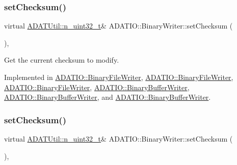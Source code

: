 \subsubsection{\texorpdfstring{setChecksum()}{setChecksum()}\hspace{0.1cm}{\footnotesize\ttfamily [2/3]}}
{\footnotesize\ttfamily virtual \mbox{\hyperlink{namespaceADATUtil_ad945a8afa4db2d1f89b731964adae97e}{A\+D\+A\+T\+Util\+::n\+\_\+uint32\+\_\+t}}\& A\+D\+A\+T\+I\+O\+::\+Binary\+Writer\+::set\+Checksum (\begin{DoxyParamCaption}{ }\end{DoxyParamCaption})\hspace{0.3cm}{\ttfamily [protected]}, {}}



Get the current checksum to modify. 



Implemented in \mbox{\hyperlink{classADATIO_1_1BinaryFileWriter_a0137ec5926d08e49ed7a63c6ef33e882}{A\+D\+A\+T\+I\+O\+::\+Binary\+File\+Writer}}, \mbox{\hyperlink{classADATIO_1_1BinaryFileWriter_a0137ec5926d08e49ed7a63c6ef33e882}{A\+D\+A\+T\+I\+O\+::\+Binary\+File\+Writer}}, \mbox{\hyperlink{classADATIO_1_1BinaryFileWriter_a0137ec5926d08e49ed7a63c6ef33e882}{A\+D\+A\+T\+I\+O\+::\+Binary\+File\+Writer}}, \mbox{\hyperlink{classADATIO_1_1BinaryBufferWriter_af4cc523a862ce29a96f1a813f254360e}{A\+D\+A\+T\+I\+O\+::\+Binary\+Buffer\+Writer}}, \mbox{\hyperlink{classADATIO_1_1BinaryBufferWriter_af4cc523a862ce29a96f1a813f254360e}{A\+D\+A\+T\+I\+O\+::\+Binary\+Buffer\+Writer}}, and \mbox{\hyperlink{classADATIO_1_1BinaryBufferWriter_af4cc523a862ce29a96f1a813f254360e}{A\+D\+A\+T\+I\+O\+::\+Binary\+Buffer\+Writer}}.

\mbox{\label{classADATIO_1_1BinaryWriter_ae64230370824192d1f0dbcaa8e74017a}} 
\subsubsection{\texorpdfstring{setChecksum()}{setChecksum()}\hspace{0.1cm}{\footnotesize\ttfamily [3/3]}}
{\footnotesize\ttfamily virtual \mbox{\hyperlink{namespaceADATUtil_ad945a8afa4db2d1f89b731964adae97e}{A\+D\+A\+T\+Util\+::n\+\_\+uint32\+\_\+t}}\& A\+D\+A\+T\+I\+O\+::\+Binary\+Writer\+::set\+Checksum (\begin{DoxyParamCaption}{ }\end{DoxyParamCaption})\hspace{0.3cm}{\ttfamily [protected]}, {}}



